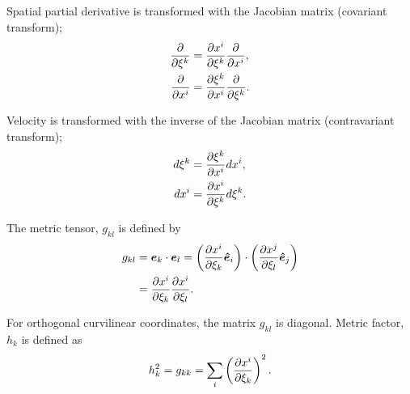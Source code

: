 Spatial partial derivative is transformed with the Jacobian matrix (covariant transform);
\begin{align}
  \frac{\partial }{\partial \xi^k} &= \frac{\partial x^i}{\partial \xi^k}\frac{\partial }{\partial x^i}, \\
  \frac{\partial }{\partial x^i} &= \frac{\partial \xi^k}{\partial x^i}\frac{\partial }{\partial \xi^k}.
\end{align}


Velocity is transformed with the inverse of the Jacobian matrix (contravariant transform);
\begin{align}
  d\xi^k &= \frac{\partial \xi^k}{\partial x^i} dx^i, \\
  dx^i &= \frac{\partial x^i}{\partial \xi^k} d\xi^k.
\end{align}



The metric tensor, $g_{kl}$ is defined by
\begin{align}
  g_{kl} &= \bm{e}_k \cdot \bm{e}_l
  = \left(\frac{\partial x^i}{\partial \xi_k}\bm{\hat{e}}_i\right) \cdot \left(\frac{\partial x^j}{\partial \xi_l}\bm{\hat{e}}_j\right) \nonumber\\
  &= \frac{\partial x^i}{\partial \xi_k}\frac{\partial x^i}{\partial \xi_l}.
\end{align}

For orthogonal curvilinear coordinates, the matrix ${g_{kl}}$ is diagonal.
Metric factor, $h_k$ is defined as
\begin{equation}
  h_k^2 = g_{kk} = \sum_i \left(\frac{\partial x^i}{\partial \xi_k}\right)^2.
\end{equation}

